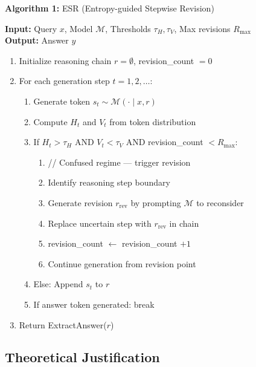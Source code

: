 \documentclass{article}
\begin{document}
\begin{algorithm}
\textbf{Algorithm 1:} ESR (Entropy-guided Stepwise Revision)
\label{alg:esr}

\vspace{0.5em}
\textbf{Input:} Query $x$, Model $\mathcal{M}$, Thresholds $\tau_H, \tau_V$, Max revisions $R_{\max}$\\
\textbf{Output:} Answer $y$
\vspace{0.5em}

\begin{enumerate}
    \item Initialize reasoning chain $r = \emptyset$, revision\_count $= 0$
    \item For each generation step $t = 1, 2, \ldots$:
    \begin{enumerate}
        \item Generate token $s_t \sim \mathcal{M}(\cdot \mid x, r)$
        \item Compute $H_t$ and $V_t$ from token distribution
        \item If $H_t > \tau_H$ AND $V_t < \tau_V$ AND revision\_count $< R_{\max}$:
        \begin{enumerate}
            \item // Confused regime --- trigger revision
            \item Identify reasoning step boundary
            \item Generate revision $r_{\text{rev}}$ by prompting $\mathcal{M}$ to reconsider
            \item Replace uncertain step with $r_{\text{rev}}$ in chain
            \item revision\_count $\leftarrow$ revision\_count $+ 1$
            \item Continue generation from revision point
        \end{enumerate}
        \item Else: Append $s_t$ to $r$
        \item If answer token generated: break
    \end{enumerate}
    \item Return ExtractAnswer($r$)
\end{enumerate}
\end{algorithm}

\subsection{Theoretical Justification}
\end{document}

